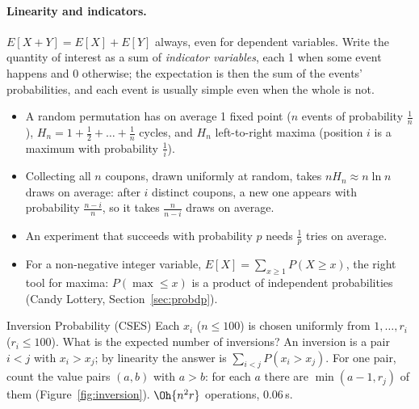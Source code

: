 \paragraph{Linearity and indicators.} $E[X + Y] = E[X] + E[Y]$ always, even for dependent variables. Write the quantity of interest as a
sum of \emph{indicator variables}, each 1 when some event happens and 0 otherwise; the expectation is then the sum of the events'
probabilities, and each event is usually simple even when the whole is not.

\begin{fact}
\begin{itemize}
  \item A random permutation has on average 1 fixed point ($n$ events of probability $\frac1n$), $H_n = 1 + \frac12 + \dots + \frac1n$
        cycles, and $H_n$ left-to-right maxima (position $i$ is a maximum with probability $\frac1i$).
  \item Collecting all $n$ coupons, drawn uniformly at random, takes $n H_n \approx n \ln n$ draws on average: after $i$ distinct
        coupons, a new one appears with probability $\frac{n-i}{n}$, so it takes $\frac{n}{n-i}$ draws on average.
  \item An experiment that succeeds with probability $p$ needs $\frac1p$ tries on average.
  \item For a non-negative integer variable, $E[X] = \sum_{x \ge 1} P(X \ge x)$, the right tool for maxima: $P(\max \le x)$ is a product
        of independent probabilities (Candy Lottery, Section~\ref{sec:probdp}).
\end{itemize}
\end{fact}

\begin{problem}{Inversion Probability (CSES)}
Each $x_i$ ($n \le 100$) is chosen uniformly from $1, \dots, r_i$ ($r_i \le 100$). What is the expected number of inversions?
\solution An inversion is a pair $i < j$ with $x_i > x_j$; by linearity the answer is $\sum_{i<j} P(x_i > x_j)$. For one pair, count
the value pairs $(a, b)$ with $a > b$: for each $a$ there are $\min(a - 1, r_j)$ of them (Figure~\ref{fig:inversion}). $\Oh{n^2 r}$
operations, 0.06\,s.
\end{problem}

